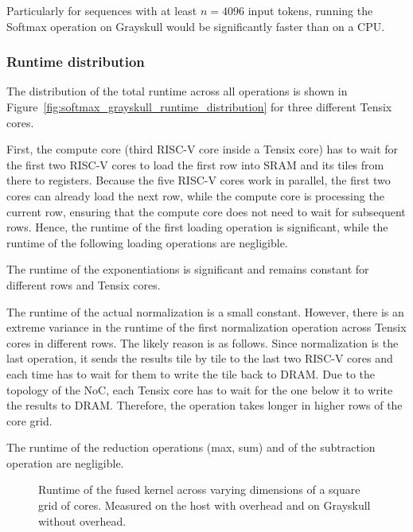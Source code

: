 \documentclass[conference]{IEEEtran}
\begin{document}
Particularly for sequences with at least \(n = 4096\) input tokens, running the Softmax operation on Grayskull would be significantly faster than on a CPU.

\subsubsection{\textbf{Runtime distribution}}
The distribution of the total runtime across all operations is shown in Figure~\ref{fig:softmax_grayskull_runtime_distribution} for three different Tensix cores.

First, the compute core (third RISC-V core inside a Tensix core) has to wait for the first two RISC-V cores to load the first row into SRAM and its tiles from there to registers. Because the five RISC-V cores work in parallel, the first two cores can already load the next row, while the compute core is processing the current row, ensuring that the compute core does not need to wait for subsequent rows. Hence, the runtime of the first loading operation is significant, while the runtime of the following loading operations are negligible. 

The runtime of the exponentiations is significant and remains constant for different rows and Tensix cores. 

The runtime of the actual normalization is a small constant. However, there is an extreme variance in the runtime of the first normalization operation across Tensix cores in different rows. The likely reason is as follows. Since normalization is the last operation, it sends the results tile by tile to the last two RISC-V cores and each time has to wait for them to write the tile back to DRAM. Due to the topology of the NoC, each Tensix core has to wait for the one below it to write the results to DRAM. Therefore, the operation takes longer in higher rows of the core grid.

The runtime of the reduction operations (max, sum) and of the subtraction operation are negligible.

\begin{figure}[b]
    \centering
    \caption{Runtime of the fused kernel across varying dimensions of a square grid of cores. Measured on the host with overhead and on Grayskull without overhead.}
    \label{fig:recompute_cache}
\end{figure}
\end{document}
